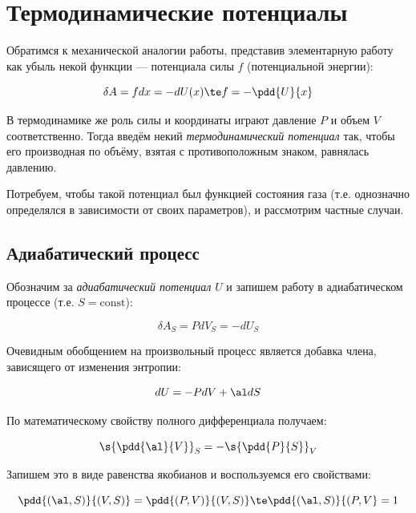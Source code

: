 \documentclass[12pt]{kiarticle}
\newcommand{\del}{\ensuremath{\delta}}
\newcommand{\co}{\ensuremath{\mathrm{const}}}
\begin{document}
\section{Термодинамические потенциалы}

Обратимся к механической аналогии работы, представив элементарную работу как убыль некой функции --- потенциала силы $ f $ (потенциальной энергии):

\begin{equation}\label{}
\del A = fdx = -dU(x) \te f = -\pdd{U}{x}
\end{equation}

В термодинамике же роль силы и координаты играют давление $ P $ и объем $ V $ соответственно. Тогда введём некий \textit{термодинамический потенциал} так, чтобы его производная по объёму, взятая с противоположным знаком, равнялась давлению. 

Потребуем, чтобы такой потенциал был функцией состояния газа (т.е. однозначно определялся в зависимости от своих параметров), и рассмотрим частные случаи.

\subsection{Адиабатический процесс}

Обозначим за \textit{адиабатический потенциал} $ U $ и запишем работу в адиабатическом процессе (т.е. $ S = \co $):

\begin{equation}\label{U_S}
\del A_S = P dV_S = - dU_S
\end{equation}

Очевидным обобщением на произвольный процесс является добавка члена, зависящего от изменения энтропии:

\begin{equation}\label{U}
dU = - PdV + \al dS
\end{equation}

По математическому свойству полного дифференциала получаем:

\begin{equation}\label{}
\s{\pdd{\al}{V}}_S = - \s{\pdd{P}{S}}_V
\end{equation}

Запишем это в виде равенства якобианов и воспользуемся его свойствами:

\begin{equation}\label{}
\pdd{(\al, S)}{(V, S)} = \pdd{(P, V)}{(V, S)} \te \pdd{(\al, S)}{(P, V} = 1
\end{equation}
\end{document}
